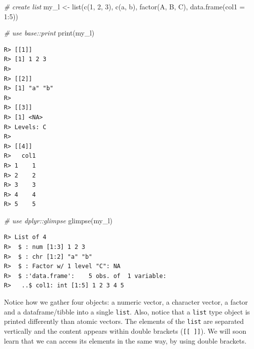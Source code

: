 \documentclass[
  12pt,
]{book}
\newenvironment{Shaded}{\begin{snugshade}}{\end{snugshade}}
\newcommand{\AttributeTok}[1]{\textcolor[rgb]{0.61,0.61,0.61}{#1}}
\newcommand{\CommentTok}[1]{\textcolor[rgb]{0.37,0.37,0.37}{\textit{#1}}}
\newcommand{\DecValTok}[1]{\textcolor[rgb]{0.06,0.06,0.06}{#1}}
\newcommand{\FunctionTok}[1]{\textcolor[rgb]{0,0,0}{#1}}
\newcommand{\NormalTok}[1]{#1}
\newcommand{\OtherTok}[1]{\textcolor[rgb]{0.37,0.37,0.37}{#1}}
\newcommand{\SpecialCharTok}[1]{\textcolor[rgb]{0,0,0}{#1}}
\newcommand{\StringTok}[1]{\textcolor[rgb]{0.5,0.5,0.5}{#1}}
\begin{document}
\begin{Shaded}
\begin{Highlighting}[]
\CommentTok{\# create list}
\NormalTok{my\_l }\OtherTok{\textless{}{-}} \FunctionTok{list}\NormalTok{(}\FunctionTok{c}\NormalTok{(}\DecValTok{1}\NormalTok{, }\DecValTok{2}\NormalTok{, }\DecValTok{3}\NormalTok{),}
             \FunctionTok{c}\NormalTok{(}\StringTok{\textquotesingle{}a\textquotesingle{}}\NormalTok{, }\StringTok{\textquotesingle{}b\textquotesingle{}}\NormalTok{),}
             \FunctionTok{factor}\NormalTok{(}\StringTok{\textquotesingle{}A\textquotesingle{}}\NormalTok{, }\StringTok{\textquotesingle{}B\textquotesingle{}}\NormalTok{, }\StringTok{\textquotesingle{}C\textquotesingle{}}\NormalTok{),}
             \FunctionTok{data.frame}\NormalTok{(}\AttributeTok{col1 =} \DecValTok{1}\SpecialCharTok{:}\DecValTok{5}\NormalTok{))}

\CommentTok{\# use base::print}
\FunctionTok{print}\NormalTok{(my\_l)}
\end{Highlighting}
\end{Shaded}

\begin{verbatim}
R> [[1]]
R> [1] 1 2 3
R> 
R> [[2]]
R> [1] "a" "b"
R> 
R> [[3]]
R> [1] <NA>
R> Levels: C
R> 
R> [[4]]
R>   col1
R> 1    1
R> 2    2
R> 3    3
R> 4    4
R> 5    5
\end{verbatim}

\begin{Shaded}
\begin{Highlighting}[]
\CommentTok{\# use dplyr::glimpse}
\FunctionTok{glimpse}\NormalTok{(my\_l)}
\end{Highlighting}
\end{Shaded}

\begin{verbatim}
R> List of 4
R>  $ : num [1:3] 1 2 3
R>  $ : chr [1:2] "a" "b"
R>  $ : Factor w/ 1 level "C": NA
R>  $ :'data.frame':    5 obs. of  1 variable:
R>   ..$ col1: int [1:5] 1 2 3 4 5
\end{verbatim}

Notice how we gather four objects: a numeric vector, a character vector, a factor and a dataframe/tibble into a single \texttt{list}. Also, notice that a \texttt{list} type object is printed differently than atomic vectors. The elements of the \texttt{list} are separated vertically and the content appears within double brackets (\texttt{{[}{[}\ {]}{]}}). We will soon learn that we can access its elements in the same way, by using double brackets.
\end{document}
